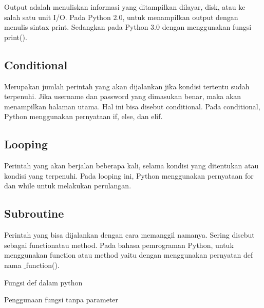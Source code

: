 {{{{{\noindent 
{\fontsize{14pt}{14pt}\selectfont Output $  $adalah menuliskan informasi yang ditampilkan dilayar, $  $disk, atau ke salah satu unit I/O. Pada Python 2.0, untuk menampilkan $  $output $  $dengan menulis sintax print. Sedangkan pada Python 3.0 dengan menggunakan fungsi print(). \\} \par
\vspace{14pt}
\noindent 
{\fontsize{14pt}{14pt}\subsection {Conditional}
\noindent 
{\fontsize{14pt}{14pt}\selectfont Merupakan jumlah perintah yang akan dijalankan jika kondisi tertentu sudah terpenuhi. Jika $  $username $  $dan $  $password $  $yang dimasukan benar, maka akan menampilkan halaman utama. Hal ini bisa disebut $  $conditional. $  $Pada $  $conditional, $  $Python menggunakan pernyataan if, else, dan elif. \\} \par
\vspace{14pt}
\noindent 
{\fontsize{14pt}{14pt}\subsection {Looping}
\noindent 
{\fontsize{14pt}{14pt}\selectfont Perintah yang akan berjalan beberapa kali, selama kondisi yang ditentukan atau kondisi yang terpenuhi. Pada $  $looping $  $ini, Python menggunakan pernyataan for dan while untuk melakukan perulangan. \\} \par
\vspace{14pt}
\noindent 
{\fontsize{14pt}{14pt}\subsection {Subroutine}
\noindent 
{\fontsize{14pt}{14pt}\selectfont Perintah yang bisa dijalankan dengan cara memanggil namanya. Sering disebut sebagai $  $functionatau $  $method. Pada bahasa pemrograman Python, untuk menggunakan $  $function $  $atau $  $method $  $yaitu dengan menggunakan pernyatan $  $def nama $  \_  $function(). \\} \par
\vspace{14pt}
\noindent 
{\fontsize{14pt}{14pt}\selectfont Fungsi def dalam python \\} \par
\noindent 
{\fontsize{14pt}{14pt}\selectfont Penggunaan fungsi tanpa parameter \\} \par
}}}}}}}}
